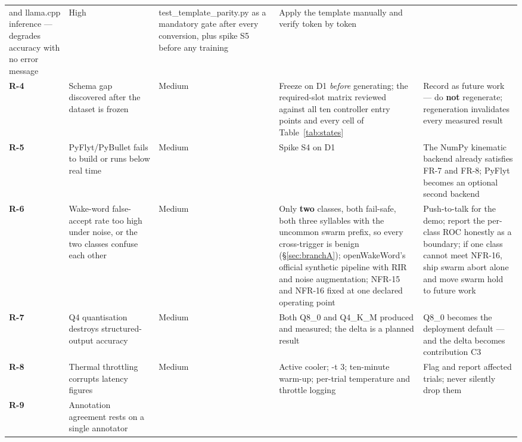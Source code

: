 \documentclass[11pt,a4paper]{article}
\newcommand{\code}[1]{{\ttfamily\small #1}}
\begin{document}
\begin{longtable}{@{}P{0.05}P{0.22}P{0.06}P{0.29}P{0.24}@{}}
  and \code{llama.cpp} inference --- degrades accuracy with no error message & \footnotesize High &
  \footnotesize \code{test\_template\_parity.py} as a mandatory gate after every conversion, plus spike S5
  before any training & \footnotesize Apply the template manually and verify token by token \\
\footnotesize \textbf{R-4} & \footnotesize Schema gap discovered after the dataset is frozen &
  \footnotesize Medium & \footnotesize Freeze on D1 \emph{before} generating; the required-slot matrix
  reviewed against all ten controller entry points and every cell of Table~\ref{tab:states} &
  \footnotesize Record as future work --- do \textbf{not} regenerate; regeneration invalidates every
  measured result \\
\footnotesize \textbf{R-5} & \footnotesize PyFlyt/PyBullet fails to build or runs below real time &
  \footnotesize Medium & \footnotesize Spike S4 on D1 & \footnotesize The NumPy kinematic backend already
  satisfies FR-7 and FR-8; PyFlyt becomes an optional second backend \\
\footnotesize \textbf{R-6} & \footnotesize Wake-word false-accept rate too high under noise, or the two
  classes confuse each other & \footnotesize Medium & \footnotesize Only \textbf{two} classes, both
  fail-safe, both three syllables with the uncommon \code{swarm} prefix, so every cross-trigger is benign
  (\S\ref{sec:branchA}); openWakeWord's official synthetic pipeline with RIR and noise augmentation; NFR-15
  and NFR-16 fixed at one declared operating point & \footnotesize Push-to-talk for the demo; report the
  per-class ROC honestly as a boundary; if one class cannot meet NFR-16, ship \code{swarm abort} alone and
  move \code{swarm hold} to future work \\
\footnotesize \textbf{R-7} & \footnotesize Q4 quantisation destroys structured-output accuracy &
  \footnotesize Medium & \footnotesize Both Q8\_0 and Q4\_K\_M produced and measured; the delta is a
  planned result & \footnotesize Q8\_0 becomes the deployment default --- and the delta becomes
  contribution C3 \\
\footnotesize \textbf{R-8} & \footnotesize Thermal throttling corrupts latency figures & \footnotesize
  Medium & \footnotesize Active cooler; \code{-t 3}; ten-minute warm-up; per-trial temperature and throttle
  logging & \footnotesize Flag and report affected trials; never silently drop them \\
\footnotesize \textbf{R-9} & \footnotesize Annotation agreement rests on a single annotator &

\end{longtable}
\end{document}
